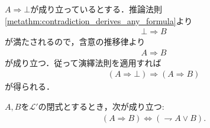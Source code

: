 	\begin{prf}
		$A \Longrightarrow \bot$が成り立っているとする．推論法則\ref{metathm:contradiction_derives_any_formula}より
		\begin{align}
			\bot \Longrightarrow B
		\end{align}
		が満たされるので，含意の推移律より
		\begin{align}
			A \Longrightarrow B
		\end{align}
		が成り立つ．従って演繹法則を適用すれば
		\begin{align}
			(A \Longrightarrow \bot) \Longrightarrow (A \Longrightarrow B)
		\end{align}
		が得られる．
		\QED
	\end{prf}
	
	\begin{screen}
		\begin{metathm}[含意は否定と論理和で表せる]\label{metathm:rule_of_inference_3}
			$A,B$を$\mathcal{L}'$の閉式とするとき，次が成り立つ:
			\begin{align}
				(A \Longrightarrow B) \Longleftrightarrow (\rightharpoondown A \vee B).
			\end{align}
		\end{metathm}
	\end{screen}
	
